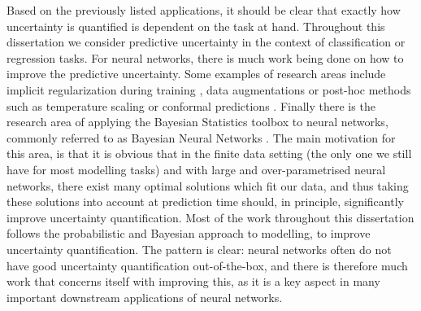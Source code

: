 \noindent Based on the previously listed applications, it should be clear that exactly how uncertainty is quantified is dependent on the task at hand. Throughout this dissertation we consider predictive uncertainty in the context of classification or regression tasks. For neural networks, there is much work being done on how to improve the predictive uncertainty. Some examples of research areas include implicit regularization during training \citep{2017_focalloss, 2020_focalloss}, data augmentations \citep{2019_mixup, 2019_labelsmoothing} or post-hoc methods such as temperature scaling \citep{2017_calibmodernnn} or conformal predictions \citep{1998_conformalpred, 1999_conformalpred}. Finally there is the research area of applying the Bayesian Statistics toolbox to neural networks, commonly referred to as Bayesian Neural Networks \citep{1992_MacKay, 2003_MacKayBNN, 2015_BayesByBack, 2019_SWAG}. The main motivation for this area, is that it is obvious that in the finite data setting (the only one we still have for most modelling tasks) and with large and over-parametrised neural networks, there exist many optimal solutions which fit our data, and thus taking these solutions into account at prediction time should, in principle, significantly improve uncertainty quantification. Most of the work throughout this dissertation follows the probabilistic and Bayesian approach to modelling, to improve uncertainty quantification. The pattern is clear: neural networks often do not have good uncertainty quantification out-of-the-box, and there is therefore much work that concerns itself with improving this, as it is a key aspect in many important downstream applications of neural networks. \\




